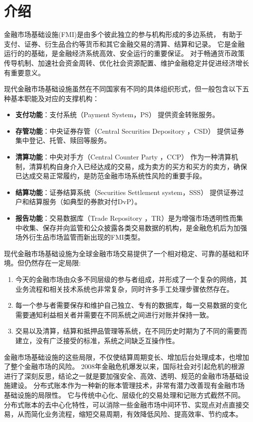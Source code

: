 
\section{介绍}

金融市场基础设施(FMI)是由多个彼此独立的参与机构形成的多边系统，
有助于支付、证券、衍生品合约等货币和其它金融交易的清算、结算和记录。
它是金融运行的的基础，是金融经济系统高效、安全运行的重要保证。
对于畅通货币政策传导机制、加速社会资金周转、优化社会资源配置、维护金融稳定并促进经济增长有重要意义。

现代金融市场基础设施虽然在不同国家有不同的具体组织形式，但一般包含以下五种基本职能及对应的支撑机构：

\begin{itemize}
    \item [\dag] \textbf{支付功能}：支付系统（Payment System，PS） 提供资金转账服务。
    \item [\dag] \textbf{存管功能}：中央证券存管（Central Securities Depository ，CSD） 提供证券集中登记、托管、赎回等服务。
    \item [\dag] \textbf{清算功能}：中央对手方（Central Counter Party ，CCP） 作为一种清算机制，清算机构自身介入已经达成的交易，成为卖方的买方和买方的卖方，确保已达成交易正常履约，是防范金融市场系统性风险的重要手段。
    \item [\dag] \textbf{结算功能}：证券结算系统（Securities Settlement system，SSS） 提供证券过户和结算服务（如典型的券款对付DvP）。
    \item [\dag] \textbf{报告功能}：交易数据库（Trade Repository ，TR）是为增强市场透明性而集中收集、保存并向监管和公众披露各类交易数据的机构，是金融危机后为加强场外衍生品市场监管而新出现的FMI类型。
\end{itemize}

现代金融市场基础设施为全球金融市场交易提供了一个相对稳定、可靠的基础和环境。但仍然存在一定局限: 
\begin{enumerate}
    \item 今天的金融市场由众多不同层级的参与者组成，并形成了一个复杂的网络，其业务流程和相关技术系统也非常复杂，同时许多手工处理步骤依然存在。
    \item 每一个参与者需要保存和维护自己独立、专有的数据库，每一交易数据的变化需要通知利益相关者并需要在不同系统之间进行对账并保持一致。
    \item 交易以及清算，结算和抵押品管理等系统，在不同历史时期为了不同的需要而建立，没有广泛接受的标准，系统之间缺乏互操作性。
\end{enumerate}
金融市场基础设施的这些局限，不仅使结算周期变长、增加后台处理成本，也增加了整个金融市场的风险。
2008年金融危机爆发以来，国际社会对引起危机的根源进行了深刻反思，结论之一就是要加强安全、高效、透明、规范的金融市场基础设施建设。
分布式账本作为一种新的账本管理技术，非常有潜力改善现有金融市场基础设施的局限性。
它与传统中心化、层级化的交易处理和记账方式截然不同。
分布式账本的去中心化特性，可以消除一些金融市场中间环节、实现点对点直接交易，从而简化业务流程，缩短交易周期，有效降低风险、提高效率、节约成本。

